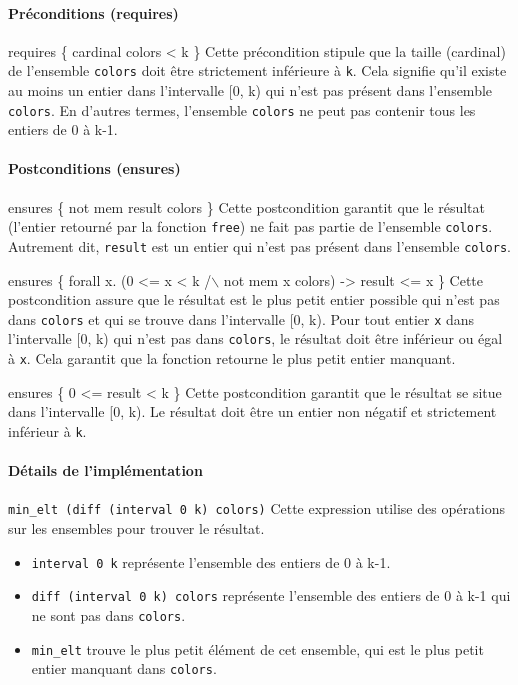 \documentclass[11pt]{article}
\begin{document}
\paragraph{Préconditions (requires)}
\label{sec:org6ac4478}

requires \{ cardinal colors < k \}
  Cette précondition stipule que la taille (cardinal) 
de l'ensemble \texttt{colors} doit être strictement inférieure à \texttt{k}.
 Cela signifie qu'il existe au moins un entier dans l'intervalle [0, k) qui n'est pas présent dans l'ensemble \texttt{colors}. 
En d'autres termes, l'ensemble \texttt{colors} ne peut pas contenir tous les entiers de 0 à k-1.

\paragraph{Postconditions (ensures)}
\label{sec:orgf2e61fd}

ensures \{ not mem result colors \}
  Cette postcondition garantit que le résultat (l'entier retourné par la fonction \texttt{free}) ne fait pas partie de l'ensemble \texttt{colors}. 
Autrement dit, \texttt{result} est un entier qui n'est pas présent dans l'ensemble \texttt{colors}.

ensures \{ forall x. (0 <= x < k /$\backslash$ not mem x colors) -> result <= x \}
  Cette postcondition assure que le résultat est le plus petit entier possible qui n'est pas dans \texttt{colors} et qui se trouve dans l'intervalle [0, k). 
Pour tout entier \texttt{x} dans l'intervalle [0, k) qui n'est pas dans \texttt{colors}, le résultat doit être inférieur ou égal à \texttt{x}. 
Cela garantit que la fonction retourne le plus petit entier manquant.

ensures \{ 0 <= result < k \}
  Cette postcondition garantit que le résultat se situe dans l'intervalle [0, k). 
Le résultat doit être un entier non négatif et strictement inférieur à \texttt{k}.

\paragraph{Détails de l'implémentation}
\label{sec:orgda8f54e}

\texttt{min\_elt (diff (interval 0 k) colors)}
  Cette expression utilise des opérations sur les ensembles pour trouver le résultat.
\begin{itemize}
\item \texttt{interval 0 k} représente l'ensemble des entiers de 0 à k-1.
\item \texttt{diff (interval 0 k) colors} représente l'ensemble des entiers de 0 à k-1 qui ne sont pas dans \texttt{colors}.
\item \texttt{min\_elt} trouve le plus petit élément de cet ensemble, qui est le plus petit entier manquant dans \texttt{colors}.
\end{itemize}
\end{document}
